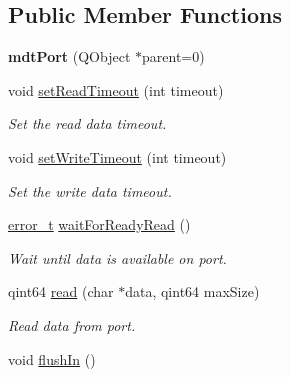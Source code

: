 \subsection*{Public Member Functions}
\begin{DoxyCompactItemize}
\item 
\hypertarget{classmdt_port_ac466eac9d1a54ea0e04c998660ad75ec}{
{\bfseries mdtPort} (QObject $\ast$parent=0)}
\label{classmdt_port_ac466eac9d1a54ea0e04c998660ad75ec}

\item 
\hypertarget{classmdt_port_aa77b266f23744f1b53ae589f986be101}{
void \hyperlink{classmdt_port_aa77b266f23744f1b53ae589f986be101}{setReadTimeout} (int timeout)}
\label{classmdt_port_aa77b266f23744f1b53ae589f986be101}

\begin{DoxyCompactList}\small\item\em Set the read data timeout. \end{DoxyCompactList}\item 
\hypertarget{classmdt_port_a2acb6e7bedacdadf78ee735dc611abfa}{
void \hyperlink{classmdt_port_a2acb6e7bedacdadf78ee735dc611abfa}{setWriteTimeout} (int timeout)}
\label{classmdt_port_a2acb6e7bedacdadf78ee735dc611abfa}

\begin{DoxyCompactList}\small\item\em Set the write data timeout. \end{DoxyCompactList}\item 
\hyperlink{classmdt_abstract_port_ad4121bb930c95887e77f8bafa065a85e}{error\_\-t} \hyperlink{classmdt_port_a84594fdb56cd455a366c69b0a9228020}{waitForReadyRead} ()
\begin{DoxyCompactList}\small\item\em Wait until data is available on port. \end{DoxyCompactList}\item 
qint64 \hyperlink{classmdt_port_ad8a196bb21b6ca76dffb068a1692904a}{read} (char $\ast$data, qint64 maxSize)
\begin{DoxyCompactList}\small\item\em Read data from port. \end{DoxyCompactList}\item 
\hypertarget{classmdt_port_a2fea088c8e5ad4578f521a39c353f7c3}{
void \hyperlink{classmdt_port_a2fea088c8e5ad4578f521a39c353f7c3}{flushIn} ()}
\label{classmdt_port_a2fea088c8e5ad4578f521a39c353f7c3}


\end{DoxyCompactItemize}
